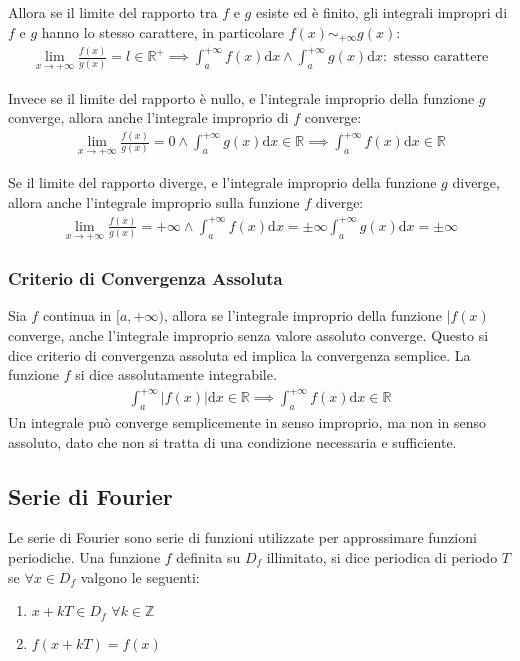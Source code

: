 \documentclass{article}
\newcommand{\df}{\mathrm{d}}
\numberwithin{equation}{subsection}
\begin{document}
Allora se il limite del rapporto tra $f$ e $g$ esiste ed è finito, gli integrali impropri di $f$ e $g$ hanno lo stesso carattere, in particolare $f(x)\sim_{+\infty} g(x)$:
\begin{gather}
    \lim_{x\to+\infty}\displaystyle\frac{f(x)}{g(x)}=l\in\mathbb{R}^+\implies\int_a^{+\infty}f(x)\df x\land\int_a^{+\infty}g(x)\df x:\mbox{ stesso carattere}
\end{gather}

Invece se il limite del rapporto è nullo, e l'integrale improprio della funzione $g$ converge, allora anche l'integrale improprio di $f$ converge:
\begin{gather}
    \lim_{x\to+\infty}\displaystyle\frac{f(x)}{g(x)}=0\land\int_a^{+\infty}g(x)\df x\in\mathbb{R}\implies\int_a^{+\infty}f(x)\df x\in\mathbb{R}
\end{gather}


Se il limite del rapporto diverge, e l'integrale improprio della funzione $g$ diverge, allora anche l'integrale improprio sulla funzione $f$ diverge:
\begin{gather}
    \lim_{x\to+\infty}\displaystyle\frac{f(x)}{g(x)}=+\infty\land\int_a^{+\infty}f(x)\df x=\pm\infty\int_a^{+\infty}g(x)\df x=\pm\infty
\end{gather}

\subsubsection{Criterio di Convergenza Assoluta}

Sia $f$ continua in $[a,+\infty)$, allora se l'integrale improprio della funzione $|f(x)$ converge, anche l'integrale improprio senza valore assoluto converge. Questo si dice criterio di convergenza assoluta ed implica la convergenza semplice. La funzione $f$ si dice assolutamente integrabile. 
\begin{gather}
    \int_a^{+\infty}|f(x)|\df x\in\mathbb{R}\implies\int_a^{+\infty}f(x)\df x\in\mathbb{R}
\end{gather}
Un integrale può converge semplicemente in senso improprio, ma non in senso assoluto, dato che non si tratta di una condizione necessaria e sufficiente. 

\subsection{Serie di Fourier} 

Le serie di Fourier sono serie di funzioni utilizzate per approssimare funzioni periodiche. 
Una funzione $f$ definita su $D_f$ illimitato, si dice periodica di periodo $T$ se $\forall x\in D_f$ valgono le seguenti:
\begin{enumerate}
    \item $x+kT\in D_f\,\,\forall k\in\mathbb{Z}$
    \item $f(x+kT)=f(x)$
\end{enumerate}
\end{document}
